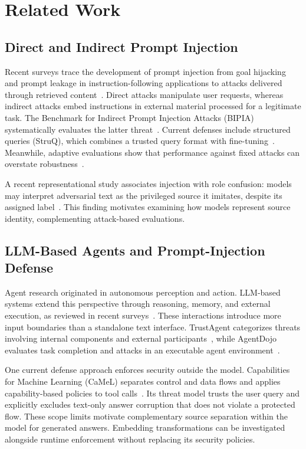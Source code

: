\documentclass[conference,letterpaper,10pt]{IEEEtran}
\begin{document}
\section{Related Work}
\subsection{Direct and Indirect Prompt Injection}
Recent surveys trace the development of prompt injection from goal hijacking
and prompt leakage in instruction-following applications to attacks delivered
through retrieved content~\cite{deng2025agents}. Direct attacks manipulate
user requests, whereas indirect attacks embed instructions in external
material processed for a legitimate task. The Benchmark for Indirect Prompt
Injection Attacks (BIPIA) systematically evaluates the
latter threat~\cite{yi2025bipia}. Current defenses include structured queries (StruQ), which
combines a trusted query format with fine-tuning~\cite{chen2025struq}.
Meanwhile, adaptive evaluations show that performance against fixed attacks
can overstate robustness~\cite{nasr2026attacker}.

A recent representational study associates injection with role confusion:
models may interpret adversarial text as the privileged source it imitates,
despite its assigned label~\cite{ye2026role}. This finding motivates examining
how models represent source identity, complementing attack-based evaluations.

\subsection{LLM-Based Agents and Prompt-Injection Defense}
Agent research originated in autonomous perception and action. LLM-based
systems extend this perspective through reasoning, memory, and external
execution, as reviewed in recent
surveys~\cite{deng2025agents,yu2025trustagent}. These interactions introduce
more input boundaries than a standalone text interface. TrustAgent categorizes
threats involving internal components and external
participants~\cite{yu2025trustagent}, while AgentDojo evaluates task
completion and attacks in an executable agent
environment~\cite{debenedetti2024agentdojo}.

One current defense approach enforces security outside the model.
Capabilities for Machine Learning (CaMeL)
separates control and data flows and applies capability-based policies to tool
calls~\cite{debenedetti2026camel}. Its threat model trusts the user query and
explicitly excludes text-only answer corruption that does not violate a
protected flow. These scope limits motivate complementary source separation
within the model for generated answers. Embedding transformations can be
investigated alongside runtime enforcement without replacing its security
policies.
\end{document}

